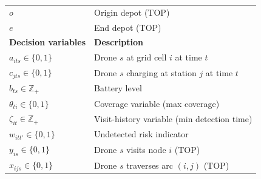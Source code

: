 \documentclass[pdflatex,sn-mathphys-num]{sn-jnl}%
\theoremstyle{thmstyleone}%
\theoremstyle{thmstyletwo}%
\theoremstyle{thmstylethree}%
\begin{document}
\begin{table}[htbp]
\begin{tabular}{lll}
$o$ & Origin depot (TOP) \\ 
$e$ & End depot (TOP) \\
\midrule
\textbf{Decision variables} & \multicolumn{2}{l}{\textbf{Description}} \\
\midrule
$a_{its}\in\{0,1\}$ & \multicolumn{2}{l}{Drone $s$ at grid cell $i$ at time $t$} \\
$c_{jts}\in\{0,1\}$ & \multicolumn{2}{l}{Drone $s$ charging at station $j$ at time $t$} \\
$b_{ts}\in\mathbb Z_+$ & \multicolumn{2}{l}{Battery level} \\
$\theta_{ti}\in\{0,1\}$ & \multicolumn{2}{l}{Coverage variable (max coverage)} \\
$\zeta_{it}\in\mathbb Z_+$ & \multicolumn{2}{l}{Visit-history variable (min detection time)} \\
$w_{itt'}\in\{0,1\}$ & \multicolumn{2}{l}{Undetected risk indicator} \\
$y_{is}\in\{0,1\}$ & \multicolumn{2}{l}{Drone $s$ visits node $i$ (TOP)} \\
$x_{ijs}\in\{0,1\}$ & \multicolumn{2}{l}{Drone $s$ traverses arc $(i,j)$ (TOP)} \\
\bottomrule
\end{tabular}
\normalsize
\end{table}

\end{document}
